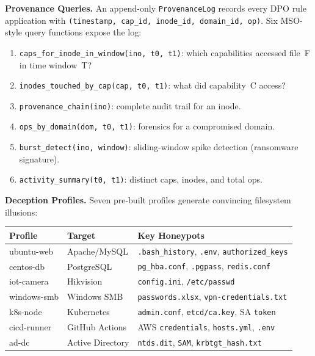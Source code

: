 \documentclass[11pt,a4paper]{article}
\theoremstyle{definition}
\begin{document}
\textbf{Provenance Queries.}  An append-only \texttt{ProvenanceLog} records every
DPO rule application with \texttt{(timestamp, cap\_id, inode\_id, domain\_id, op)}.
Six MSO-style query functions expose the log:
\begin{enumerate}[nosep]
\item \texttt{caps\_for\_inode\_in\_window(ino, t0, t1)}: which capabilities
  accessed file~F in time window~T?
\item \texttt{inodes\_touched\_by\_cap(cap, t0, t1)}: what did capability~C access?
\item \texttt{provenance\_chain(ino)}: complete audit trail for an inode.
\item \texttt{ops\_by\_domain(dom, t0, t1)}: forensics for a compromised domain.
\item \texttt{burst\_detect(ino, window)}: sliding-window spike detection
  (ransomware signature).
\item \texttt{activity\_summary(t0, t1)}: distinct caps, inodes, and total ops.
\end{enumerate}

\textbf{Deception Profiles.}  Seven pre-built profiles generate convincing
filesystem illusions:

\begin{center}\small
\begin{tabular}{llp{5cm}}
\toprule
\textbf{Profile} & \textbf{Target} & \textbf{Key Honeypots} \\
\midrule
ubuntu-web  & Apache/MySQL  & \texttt{.bash\_history}, \texttt{.env}, \texttt{authorized\_keys} \\
centos-db   & PostgreSQL    & \texttt{pg\_hba.conf}, \texttt{.pgpass}, \texttt{redis.conf} \\
iot-camera  & Hikvision     & \texttt{config.ini}, \texttt{/etc/passwd} \\
windows-smb & Windows SMB   & \texttt{passwords.xlsx}, \texttt{vpn-credentials.txt} \\
k8s-node    & Kubernetes    & \texttt{admin.conf}, \texttt{etcd/ca.key}, SA \texttt{token} \\
cicd-runner & GitHub Actions & AWS \texttt{credentials}, \texttt{hosts.yml}, \texttt{.env} \\
ad-dc       & Active Directory & \texttt{ntds.dit}, \texttt{SAM}, \texttt{krbtgt\_hash.txt} \\
\bottomrule
\end{tabular}
\end{center}
\end{document}
